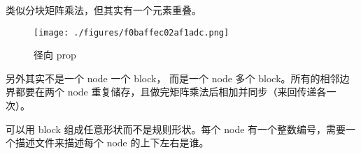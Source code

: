 
类似分块矩阵乘法，但其实有一个元素重叠。
\begin{figure}[ht]
\centering
\texttt{[image: ./figures/f0baffec02af1adc.png]}
\caption{径向 prop} \label{fig_HeMPI_1}
\end{figure}
另外其实不是一个 node 一个 block， 而是一个 node 多个 block。所有的相邻边界都要在两个 node 重复储存，且做完矩阵乘法后相加并同步（来回传递各一次）。

可以用 block 组成任意形状而不是规则形状。每个 node 有一个整数编号，需要一个描述文件来描述每个 node 的上下左右是谁。
